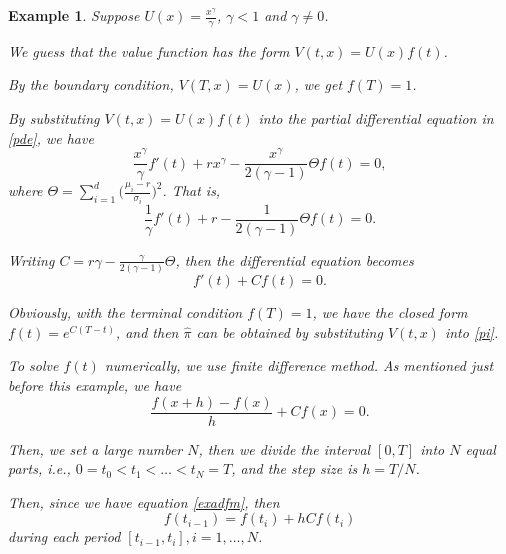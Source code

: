 \documentclass[a4paper]{article}
\newtheorem{exa}{Example}[section]
\theoremstyle{definition}
\numberwithin{equation}{section}
\begin{document}
\begin{exa}
Suppose $U(x)=\frac{x^\gamma}{\gamma}$, $\gamma<1$ and $\gamma\neq0$.

We guess that the value function has the form $V(t,x)=U(x)f(t)$.

By the boundary condition, $V(T,x)=U(x)$, we get $f(T)=1$.

By substituting $V(t,x)=U(x)f(t)$ into the partial differential equation in \eqref{pde}, we have
$$\frac{x^\gamma}{\gamma}f'(t)+rx^\gamma-\frac{x^\gamma}{2(\gamma-1)}\Theta f(t)=0,$$
where $\Theta=\sum^d_{i=1}\big(\frac{\mu_i-r}{\sigma_i}\big)^2$.
That is,
$$\frac{1}{\gamma}f'(t)+r-\frac{1}{2(\gamma-1)}\Theta f(t)=0.$$

Writing $C=r\gamma-\frac{\gamma}{2(\gamma-1)}\Theta$, then the differential equation becomes
\begin{equation}\nonumber
f'(t)+Cf(t)=0.
\end{equation}

Obviously, with the terminal condition $f(T)=1$, we have the closed form $f(t)=e^{C(T-t)}$, and then $\hat\pi$ can be obtained by substituting $V(t,x)$ into \eqref{pi}.

To solve $f(t)$ numerically, we use finite difference method. As mentioned just before this example, we have
\begin{equation}\label{exadfm}
\frac{f(x+h)-f(x)}{h}+Cf(x)=0.
\end{equation}

Then, we set a large number $N$, then we divide the interval $[0,T]$ into $N$ equal parts, i.e., $0=t_0<t_1<\dots<t_N=T$, and the step size is $h=T/N$.

Then, since we have equation \eqref{exadfm}, then
\begin{equation}\label{exadfm2}
f(t_{i-1})=f(t_i)+hCf(t_i)
\end{equation}
during each period $[t_{i-1},t_i],i=1,\dots,N$.


\end{exa}
\end{document}
